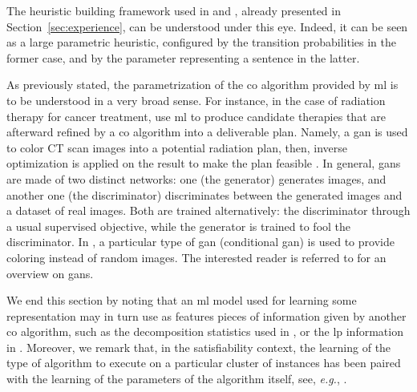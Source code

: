 \documentclass[11pt]{article}
\begin{document}
		The heuristic building framework used in \cite{KarapetyanMarkov2017} and \cite{MasciaGrammar2014},
		already presented in Section~\ref{sec:experience}, can be understood under this eye.
		Indeed, it can be seen as a large parametric heuristic, configured by the transition probabilities
		in the former case, and by the parameter representing a sentence in the latter.

		As previously stated, the parametrization of the \gls{co} algorithm provided by \gls{ml} is to be
		understood in a very broad sense.
		For instance, in the case of radiation therapy for cancer treatment,
		\cite{MahmoodAutomatedTreatmentPlanning2018} use \gls{ml} to produce candidate therapies that are
		afterward refined by a \gls{co} algorithm into a deliverable plan.
		Namely, a \gls{gan} is used to color CT scan images into a potential radiation plan, then, inverse
		optimization \citep{AhujaInverseOptimization2001} is applied on the result to make the plan
		feasible \citep{ChanGeneralizedInverseMultiobjective2014}.
		In general, \glspl{gan} are made of two distinct networks: one (the generator) generates images,
		and another one (the discriminator) discriminates between the generated images and a dataset of
		real images.
		Both are trained alternatively: the discriminator through a usual supervised objective, while the
		generator is trained to fool the discriminator.
		In \cite{MahmoodAutomatedTreatmentPlanning2018}, a particular type of \gls{gan} (conditional
		\gls{gan}) is used to provide coloring instead of random images.
		The interested reader is referred to \cite{CreswellGenerativeAdversarialNetworks2018} for an
		overview on \glspl{gan}.

		We end this section by noting that an \gls{ml} model used for learning some representation may in
		turn use as features pieces of information given by another \gls{co} algorithm, such as the
		decomposition statistics used in \cite{KruberLearningWhenUse2017}, or the \gls{lp} information in
		\cite{BonamiLearningClassificationMixedInteger2018}.
		Moreover, we remark that, in the satisfiability context, the learning of the type of algorithm
		to execute on a particular cluster of instances has been paired with the learning of the
		parameters of the algorithm itself, see, \textit{e.g.},
		\cite{AnsoteguiReactive2017, AnsoteguiHyperReactive2019}.
\end{document}
